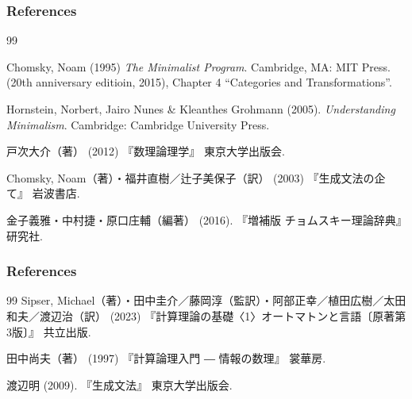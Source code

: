 \documentclass[dvipdfmx, xcolor={dvipsnames},12pt]{beamer}
\begin{document}
\begin{frame}
\frametitle{References}
\begin{thebibliography}{99}

Chomsky, Noam (1995) \textit{The Minimalist Program}. Cambridge, MA: MIT Press.
(20th anniversary editioin, 2015), Chapter 4 “Categories and Transformations”.

Hornstein, Norbert, Jairo Nunes \& Kleanthes Grohmann (2005). \textit{Understanding Minimalism}. Cambridge: Cambridge University Press.

戸次大介（著） (2012)
『数理論理学』 東京大学出版会.

Chomsky, Noam（著）・福井直樹／辻子美保子（訳） (2003)
『生成文法の企て』 岩波書店.

金子義雅・中村捷・原口庄輔（編著） (2016). 『増補版 チョムスキー理論辞典』研究社.
\end{thebibliography}
\end{frame}

\begin{frame}
\frametitle{References}
\begin{thebibliography}{99}
Sipser, Michael（著）・田中圭介／藤岡淳（監訳）・阿部正幸／植田広樹／太田和夫／渡辺治（訳） (2023)
『計算理論の基礎〈1〉オートマトンと言語〔原著第3版〕』 共立出版.

田中尚夫（著） (1997)
『計算論理入門 ― 情報の数理』 裳華房.

渡辺明 (2009). 『生成文法』 東京大学出版会.
\end{thebibliography}
\end{frame}
\end{document}
